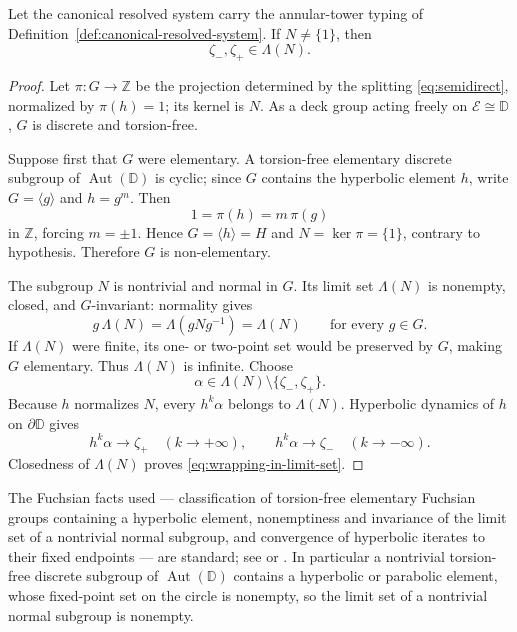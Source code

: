 \begin{lemma}\label{lem:wrapping}
Let the canonical resolved system carry the annular-tower typing of Definition~\ref{def:canonical-resolved-system}.  If \(N\ne\{1\}\), then
\begin{equation}\label{eq:wrapping-in-limit-set}
\zeta_-,\zeta_+\in\Lambda(N).
\end{equation}
\end{lemma}

\begin{proof}
Let \(\pi\colon G\to\mathbb Z\) be the projection determined by the splitting \eqref{eq:semidirect}, normalized by \(\pi(h)=1\); its kernel is \(N\).  As a deck group acting freely on \(\mathcal E\cong\mathbb D\), \(G\) is discrete and torsion-free.

Suppose first that \(G\) were elementary.  A torsion-free elementary discrete subgroup of \(\operatorname{Aut}(\mathbb D)\) is cyclic; since \(G\) contains the hyperbolic element \(h\), write \(G=\langle g\rangle\) and \(h=g^m\).  Then
\[
1=\pi(h)=m\,\pi(g)
\]
in \(\mathbb Z\), forcing \(m=\pm1\).  Hence \(G=\langle h\rangle=H\) and \(N=\ker\pi=\{1\}\), contrary to hypothesis.  Therefore \(G\) is non-elementary.

The subgroup \(N\) is nontrivial and normal in \(G\).  Its limit set \(\Lambda(N)\) is nonempty, closed, and \(G\)-invariant: normality gives
\[
g\,\Lambda(N)=\Lambda(gNg^{-1})=\Lambda(N)
\qquad\text{for every } g\in G.
\]
If \(\Lambda(N)\) were finite, its one- or two-point set would be preserved by \(G\), making \(G\) elementary.  Thus \(\Lambda(N)\) is infinite.  Choose
\[
\alpha\in\Lambda(N)\setminus\{\zeta_-,\zeta_+\}.
\]
Because \(h\) normalizes \(N\), every \(h^k\alpha\) belongs to \(\Lambda(N)\).  Hyperbolic dynamics of \(h\) on \(\partial\mathbb D\) gives
\[
h^k\alpha\to\zeta_+\quad(k\to+\infty),
\qquad
h^k\alpha\to\zeta_-\quad(k\to-\infty).
\]
Closedness of \(\Lambda(N)\) proves \eqref{eq:wrapping-in-limit-set}.
\end{proof}

\begin{remark}\label{rem:fuchsian-facts}
The Fuchsian facts used --- classification of torsion-free elementary
Fuchsian groups containing a hyperbolic element, nonemptiness and
invariance of the limit set of a nontrivial normal subgroup, and
convergence of hyperbolic iterates to their fixed endpoints --- are
standard; see \cite{Beardon83} or \cite{Katok92}.  In particular a
nontrivial torsion-free discrete subgroup of
$\operatorname{Aut}(\mathbb D)$ contains a hyperbolic or parabolic
element, whose fixed-point set on the circle is nonempty, so the limit
set of a nontrivial normal subgroup is nonempty.
\end{remark}